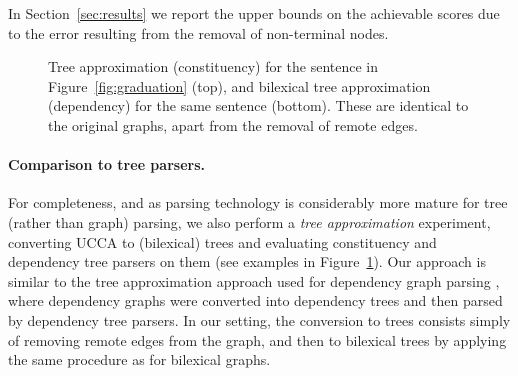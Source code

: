 \documentclass[11pt,a4paper]{article}
\newcommand{\secref}[1]{Section~\ref{#1}}
\newcommand{\figref}[1]{Figure~\ref{#1}}
\begin{document}
In \secref{sec:results} we report the upper bounds on the achievable scores due to the
error resulting from the removal of non-terminal nodes.

\begin{figure}
	\centering
  \caption{Tree approximation (constituency) for the sentence in \figref{fig:graduation} (top),
  and bilexical tree approximation (dependency) for the same sentence (bottom).
  These are identical to the original graphs,
  apart from the removal of remote edges.}
  \label{fig:tree_example}
\end{figure}

\paragraph{Comparison to tree parsers.}
For completeness,
and as parsing technology is considerably more mature for tree (rather than graph) parsing,
we also perform a \textit{tree approximation} experiment, converting UCCA to (bilexical) trees
and evaluating constituency and dependency tree parsers on them
(see examples in \figref{fig:tree_example}).
Our approach is similar
to the tree approximation approach used for dependency graph parsing
\cite{agic2015semantic,fernandez2015parsing},
where dependency graphs were converted into dependency trees
and then parsed by dependency tree parsers.
In our setting, the conversion to trees consists simply of removing remote edges from the 
graph, and then to bilexical trees by applying the same procedure as for bilexical graphs.
\end{document}

